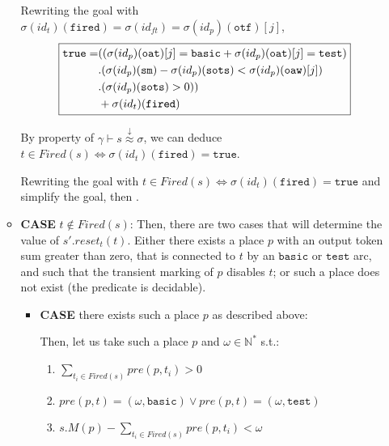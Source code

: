 \documentclass[dvipsnames,12pt]{article}
\begin{document}
\begin{niproof}
\begin{itemize}
\begin{itemize}
      Rewriting the goal with
      $\sigma(id_t)(\texttt{fired})=\sigma(id_{ft})=\sigma(id_p)(\texttt{otf})[j]$,
      \begin{equation*}
        \fbox{$\begin{split}
            \mathtt{true}=& ((\sigma(id_p)(\texttt{oat})[j]=\mathtt{basic}+\sigma(id_p)(\texttt{oat})[j]=\mathtt{test}) \\
            & .(\sigma(id_p)(\texttt{sm})-\sigma(id_p)(\texttt{sots})<\sigma(id_p)(\texttt{oaw})[j])\\
            & .(\sigma(id_p)(\texttt{sots})>0))\\
            & +\sigma(id_t)(\texttt{fired}) \\
          \end{split}$}
      \end{equation*}

      By property of
      $\gamma\vdash{}s\stackrel{\downarrow}{\approx}\sigma$, we can
      deduce
      $t\in{}Fired(s)\Leftrightarrow\sigma(id_t)(\texttt{fired})=\mathtt{true}$.

      Rewriting the goal with
      $t\in{}Fired(s)\Leftrightarrow\sigma(id_t)(\texttt{fired})=\mathtt{true}$
      and simplify the goal, then .

    \item \textbf{CASE} $t\notin{}Fired(s)$: Then, there are two cases
      that will determine the value of $s'.reset_t(t)$. Either there
      exists a place $p$ with an output token sum greater than zero,
      that is connected to $t$ by an $\mathtt{basic}$ or
      $\mathtt{test}$ arc, and such that the transient marking of $p$
      disables $t$; or such a place does not exist (the predicate is
      decidable).

      \begin{itemize}
      \item \textbf{CASE} there exists such a place $p$ as described
        above:

        Then, let us take such a place $p$ and $\omega\in\mathbb{N}^{*}$ s.t.:
        \begin{enumerate}
        \item $\sum\limits_{t_i\in{}Fired(s)}pre(p,t_i)>0$\label{item:1}
        \item
          $pre(p,t)=(\omega,\mathtt{basic})\lor{}pre(p,t)=(\omega,\mathtt{test})$\label{item:2}
        \item
          $s.M(p)-\sum\limits_{t_i\in{}Fired(s)}pre(p,t_i)<\omega$\label{item:3}
        \end{enumerate}


\end{itemize}
\end{itemize}
\end{itemize}
\end{niproof}
\end{document}
